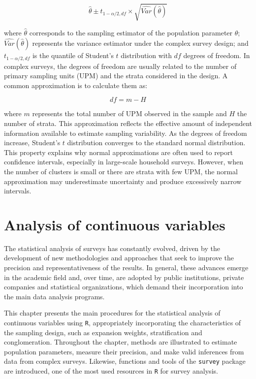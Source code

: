 \documentclass[
  english,
  12pt,
]{book}
\begin{document}
\[
\hat{\theta} \pm t_{1-\alpha/2, df} \times \sqrt{\widehat{Var}(\hat{\theta})}
\]

where \(\hat{\theta}\) corresponds to the sampling estimator of the population parameter \(\theta\); \(\widehat{Var}(\hat{\theta})\) represents the variance estimator under the complex survey design; and \(t_{1-\alpha/2, df}\) is the quantile of Student's \(t\) distribution with \(df\) degrees of freedom. In complex surveys, the degrees of freedom are usually related to the number of primary sampling units (UPM) and the strata considered in the design. A common approximation is to calculate them as:

\[
df = m - H
\]

where \(m\) represents the total number of UPM observed in the sample and \(H\) the number of strata. This approximation reflects the effective amount of independent information available to estimate sampling variability. As the degrees of freedom increase, Student's \(t\) distribution converges to the standard normal distribution. This property explains why normal approximations are often used to report confidence intervals, especially in large-scale household surveys. However, when the number of clusters is small or there are strata with few UPM, the normal approximation may underestimate uncertainty and produce excessively narrow intervals.

\chapter{Analysis of continuous variables}\label{cap3}

The statistical analysis of surveys has constantly evolved, driven by the development of new methodologies and approaches that seek to improve the precision and representativeness of the results. In general, these advances emerge in the academic field and, over time, are adopted by public institutions, private companies and statistical organizations, which demand their incorporation into the main data analysis programs.

This chapter presents the main procedures for the statistical analysis of continuous variables using \texttt{R}, appropriately incorporating the characteristics of the sampling design, such as expansion weights, stratification and conglomeration. Throughout the chapter, methods are illustrated to estimate population parameters, measure their precision, and make valid inferences from data from complex surveys. Likewise, functions and tools of the \texttt{survey} \citep{Lumley2024} package are introduced, one of the most used resources in \texttt{R} for survey analysis.
\end{document}
